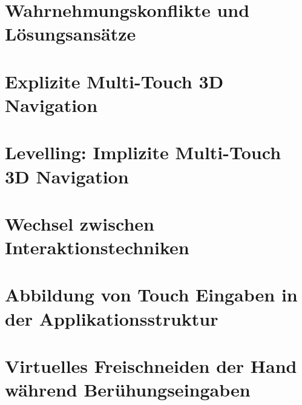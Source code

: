 \documentclass[pdftex,12pt,a4paper]{report}
\begin{document}

\chapter{Wahrnehmungskonflikte und Lösungsansätze}
\label{chp:wahrnehmungskonflikte_und_loesungsansaetze}



\chapter{Explizite Multi-Touch 3D Navigation}
\label{chp:explizite_interaktion}



\chapter{Levelling: Implizite Multi-Touch 3D Navigation}
\label{chp:implizite_navigation}



\chapter{Wechsel zwischen Interaktionstechniken}
\label{chp:wechsel_zwischen_interaktionstechniken}



\chapter{Abbildung von Touch Eingaben in der Applikationsstruktur}
\label{chp:applikationsstruktur}



\chapter{Virtuelles Freischneiden der Hand während Berühungseingaben}
\label{chp:freischneiden}


\end{document}

